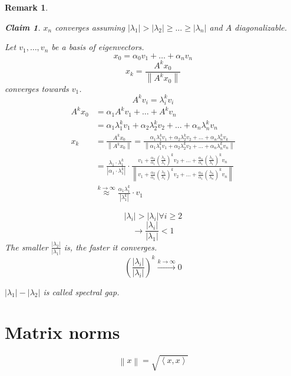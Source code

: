 \documentclass{article}
\newtheorem*{claim}{Claim}%
\newtheorem{remark}{Remark}  \numberwithin{remark}{section}
\newcommand{\angel}[1]{\left\langle#1\right\rangle}
\newcommand{\norm}[1]{\left\|#1\right\|}
\newcommand{\card}[1]{\left|#1\right|}
\begin{document}
\begin{remark}
\begin{description}
    \begin{claim}
      $x_n$ converges assuming $\card{\lambda_1} > \card{\lambda_2} \geq \dots \geq \card{\lambda_n}$ and $A$ diagonalizable.
    \end{claim}
    Let $v_1, \dots, v_n$ be a basis of eigenvectors.
    \[ x_0 = \alpha_0 v_1 + \dots + \alpha_n v_n \]
    \[ x_k = \frac{A^k x_0}{\norm{A^k x_0}} \]
    converges towards $v_1$.
    \[ A^k v_i = \lambda_i^k v_i \]
    \begin{align*}
      A^k x_0 &= \alpha_1 A^k v_1 + \dots + A^k v_n \\
          &= \alpha_1 \lambda_1^k v_1 + \alpha_2 \lambda_2^k v_2 + \dots + \alpha_n \lambda_n^k v_n \\
      x_k &= \frac{A^k x_0}{\norm{A^k x_0}} = \frac{\alpha_1 \lambda_1^k v_1 + \alpha_2 \lambda_2^k v_2 + \dots + \alpha_n \lambda_n^k v_k}{\norm{\alpha_1 \lambda_1^k v_1 + \alpha_2 \lambda_2^k v_2 + \dots + \alpha_n \lambda_n^k v_n}} \\
          &= \frac{\lambda_1 \cdot \lambda_1^k}{\card{\alpha_1 \cdot \lambda_1^k}} \cdot
            \frac{v_1 + \frac{\alpha_2}{\alpha_1} \left(\frac{\lambda_2}{\lambda_1}\right)^k v_2 + \dots + \frac{\alpha_n}{\alpha_1} \left(\frac{\lambda_n}{\lambda_1}\right)^k v_n}{\norm{v_1 + \frac{\alpha_2}{\alpha_1} \left(\frac{\lambda_2}{\lambda_1}\right)^k v_2 + \dots + \frac{\alpha_n}{\alpha_1} \left(\frac{\lambda_n}{\lambda_n}\right)^k v_n}} \\
          &\overset{k \to \infty}\approx \frac{\alpha_1 \lambda_1^k}{\card{\lambda_1^k}} \cdot v_1
    \end{align*}
  \end{description}

  \[ \card{\lambda_i} > \card{\lambda_i} \forall i \geq 2 \]
  \[ \to \frac{\card{\lambda_i}}{\card{\lambda_1}} < 1 \]
  The smaller $\frac{\card{\lambda_2}}{\card{\lambda_1}}$ is, the faster it converges.
  \[ \left(\frac{\card{\lambda_i}}{\card{\lambda_i}}\right)^k \xrightarrow{k \to \infty} 0 \]

  $\card{\lambda_1} - \card{\lambda_2}$ is called \emph{spectral gap}.
\end{remark}

\section{Matrix norms}
\[ \norm{x} = \sqrt{\angel{x, x}} \]
\end{document}
